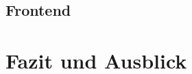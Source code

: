 \documentclass[a4paper, 10pt, conference]{IEEEtran}
\begin{document}
\subsection{Frontend}\label{subsec:frontend-dev-tools}



\section{Fazit und Ausblick}\label{sec:fazit}




\printbibliography
\end{document}

